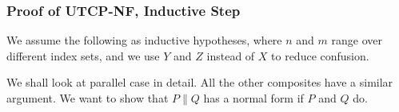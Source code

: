 \newpage
\subsubsection{Proof of \textsf{UTCP-NF}, Inductive Step}

We assume the following as inductive hypotheses,
where $n$ and $m$ range over different index sets,
and we use $Y$ and $Z$ instead of $X$ to reduce confusion.


We shall look at parallel case in detail.
All the other composites have a similar argument.
We want to show that $P \parallel Q$ has a normal form
if $P$ and $Q$ do.
